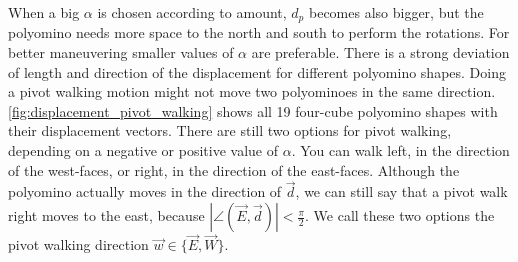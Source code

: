 When a big $\alpha$ is chosen according to amount, $d_p$ becomes also bigger, but the polyomino needs more space to the north and south to perform the rotations.
For better maneuvering smaller values of $\alpha$ are preferable.
There is a strong deviation of length and direction of the displacement for different polyomino shapes.
Doing a pivot walking motion might not move two polyominoes in the same direction.
\autoref{fig:displacement_pivot_walking} shows all 19 four-cube polyomino shapes with their displacement vectors.
There are still two options for pivot walking, depending on a negative or positive value of $\alpha$.
You can walk left, in the direction of the west-faces, or right, in the direction of the east-faces.
Although the polyomino actually moves in the direction of $\vec{d}$, we can still say that a pivot walk right moves to the east, because $\left| \angle \left( \vec{E}, \vec{d} \right) \right| < \frac{\pi}{2}$.
We call these two options the pivot walking direction $\vec{w} \in \{\vec{E}, \vec{W}\}$.
